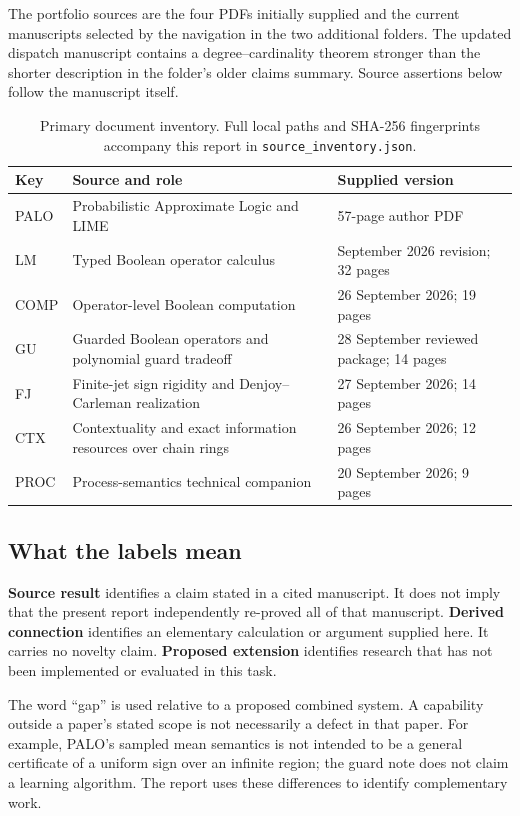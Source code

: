 \documentclass[11pt,a4paper]{article}
\theoremstyle{remark}
\begin{document}
The portfolio sources are the four PDFs initially supplied and the current manuscripts selected by the navigation in the two additional folders. The updated dispatch manuscript contains a degree--cardinality theorem stronger than the shorter description in the folder's older claims summary. Source assertions below follow the manuscript itself.

\begin{table}[htbp]
\centering\small
\begin{tabularx}{\textwidth}{@{}P{16mm}YP{32mm}@{}}
\toprule
Key & Source and role & Supplied version\\
\midrule
PALO & Probabilistic Approximate Logic and LIME~\cite{palo} & 57-page author PDF\\
LM & Typed Boolean operator calculus~\cite{lm} & September 2026 revision; 32 pages\\
COMP & Operator-level Boolean computation~\cite{compiler} & 26 September 2026; 19 pages\\
GU & Guarded Boolean operators and polynomial guard tradeoff~\cite{guard} & 28 September reviewed package; 14 pages\\
FJ & Finite-jet sign rigidity and Denjoy--Carleman realization~\cite{jet} & 27 September 2026; 14 pages\\
CTX & Contextuality and exact information resources over chain rings~\cite{context} & 26 September 2026; 12 pages\\
PROC & Process-semantics technical companion~\cite{process} & 20 September 2026; 9 pages\\
\bottomrule
\end{tabularx}
\caption{Primary document inventory. Full local paths and SHA-256 fingerprints accompany this report in \texttt{source\_inventory.json}.}
\end{table}

\subsection{What the labels mean}
\textbf{Source result} identifies a claim stated in a cited manuscript. It does not imply that the present report independently re-proved all of that manuscript. \textbf{Derived connection} identifies an elementary calculation or argument supplied here. It carries no novelty claim. \textbf{Proposed extension} identifies research that has not been implemented or evaluated in this task.

The word ``gap'' is used relative to a proposed combined system. A capability outside a paper's stated scope is not necessarily a defect in that paper. For example, PALO's sampled mean semantics is not intended to be a general certificate of a uniform sign over an infinite region; the guard note does not claim a learning algorithm. The report uses these differences to identify complementary work.
\end{document}

